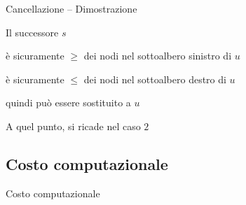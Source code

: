\begin{frame}{Cancellazione -- Dimostrazione}

\begin{myboxtitle}
\BI
\item Il successore $s$ 
\BI
\item è sicuramente $\geq$ dei nodi nel sottoalbero sinistro di $u$
\item è sicuramente $\leq$ dei nodi nel sottoalbero destro di $u$
\EI
\item quindi può essere sostituito a $u$
\item A quel punto, si ricade nel caso $2$
\EI
\end{myboxtitle}

\end{frame}


\subsection{Costo computazionale}

\begin{frame}{Costo computazionale}

\vspace{-12pt}

\end{frame}


